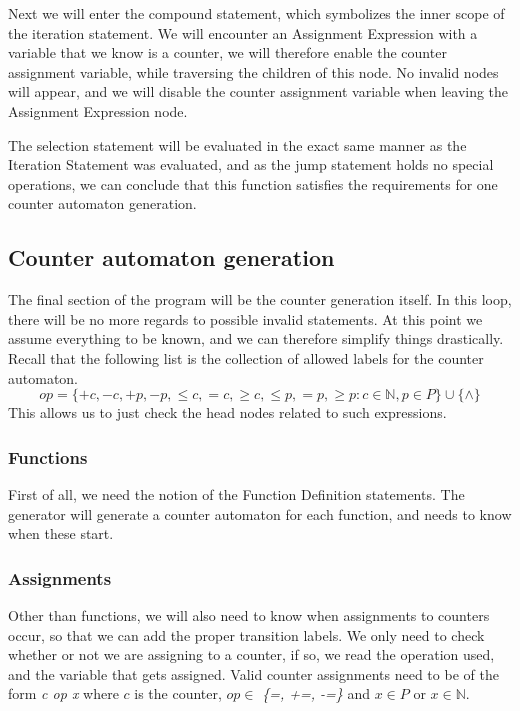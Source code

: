 \documentclass[12pt]{article}
\begin{document}
Next we will enter the compound statement, which symbolizes the inner scope of the iteration statement. We will encounter an Assignment Expression with a variable that we know is a counter, we will therefore enable the counter assignment variable, while traversing the children of this node. No invalid nodes will appear, and we will disable the counter assignment variable when leaving the Assignment Expression node. 

The selection statement will be evaluated in the exact same manner as the Iteration Statement was evaluated, and as the jump statement holds no special operations, we can conclude that this function satisfies the requirements for one counter automaton generation.

\subsection{Counter automaton generation}
\label{sec:generation}
The final section of the program will be the counter generation itself. In this loop, there will be no more regards to possible invalid statements. At this point we assume everything to be known, and we can therefore simplify things drastically. Recall that the following list is the collection of allowed labels for the counter automaton.
\[
op = \{+c, -c, +p, -p, \leq c, =c, \geq c, \leq p, =p, \geq p: c \in \mathbb{N}, p \in P\} \cup \{\wedge\}
\]
This allows us to just check the head nodes related to such expressions.

\subsubsection{Functions}
First of all, we need the notion of the Function Definition statements. The generator will generate a counter automaton for each function, and needs to know when these start.

\subsubsection{Assignments}
Other than functions, we will also need to know when assignments to counters occur, so that we can add the proper transition labels. We only need to check whether or not we are assigning to a counter, if so, we read the operation used, and the variable that gets assigned. Valid counter assignments need to be of the form \textit{c op x} where $c$ is the counter, $op \in $ \textit{\{=, +=, -=\}} and $x \in P$ or $x \in \mathbb{N}$. 
\end{document}
